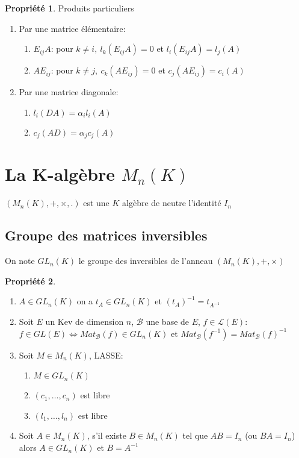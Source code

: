 \documentclass[fleqn]{article}
\theoremstyle{definition} \newtheorem*{defi}{D\'efinition}
\theoremstyle{definition} \newtheorem*{theo}{Th\'eor\`eme}
\theoremstyle{definition} \newtheorem*{coro}{Corollaire}
\theoremstyle{definition} \newtheorem*{nota}{Notation}
\theoremstyle{definition} \newtheorem*{vocab}{Vocabulaire}
\theoremstyle{remark} \newtheorem*{rqs}{Remarques}
\theoremstyle{definition} \newtheorem*{prop}{Propri\'et\'e}
\begin{document}
\begin{prop} Produits particuliers
	\begin{enumerate}
		\item Par une matrice \'el\'ementaire:
			\begin{enumerate}
				\item $E_{ij} A$: pour $k \neq i,\ l_k(E_{ij}A) = 0$ et $l_i (E_{ij}A) = l_j(A)$
				\item $A E_{ij}$: pour $k \neq j,\ c_k(A E_{ij}) = 0$ et $c_j(A E_{ij}) = c_i(A)$
			\end{enumerate}
		\item Par une matrice diagonale:
			\begin{enumerate}
				\item $l_i(DA) = \alpha_i l_i(A)$
				\item $c_j(AD) = \alpha_j c_j(A)$
			\end{enumerate}
	\end{enumerate}
\end{prop}

\section{La K-alg\`ebre $M_n(K)$}
$(M_n(K), +, \times, .)$ est une $K$ alg\`ebre de neutre l'identit\'e $I_n$

\subsection{Groupe des matrices inversibles}
On note $GL_n(K)$ le groupe des inversibles de l'anneau $(M_n(K), +, \times)$

\begin{prop} $ $
	\begin{enumerate}
		\item $A \in GL_n(K)$ on a $t_A \in GL_n(K)$ et $(t_A)^{-1} = t_{A^{-1}}$
		\item Soit $E$ un Kev de dimension $n$, $\mathscr{B}$ une base de $E$, $f \in \mathscr{L}(E)$:\\
			$f \in GL(E) \Leftrightarrow Mat_{\mathscr{B}}(f) \in GL_n(K)$ et $Mat_{\mathscr{B}}(f^{-1}) = Mat_{\mathscr{B}}(f)^{-1}$
		\item Soit $M \in M_n(K)$, LASSE:
			\begin{enumerate}
				\item $M \in GL_n(K)$
				\item $(c_1, \hdots, c_n)$ est libre
				\item $(l_1, \hdots, l_n)$ est libre
			\end{enumerate}
		\item Soit $A \in M_n(K)$, s'il existe $B \in M_n(K)$ tel que $AB = I_n$ (ou $BA = I_n$) alors $A \in GL_n(K)$ et $B = A^{-1}$
	\end{enumerate}
\end{prop}
\end{document}
